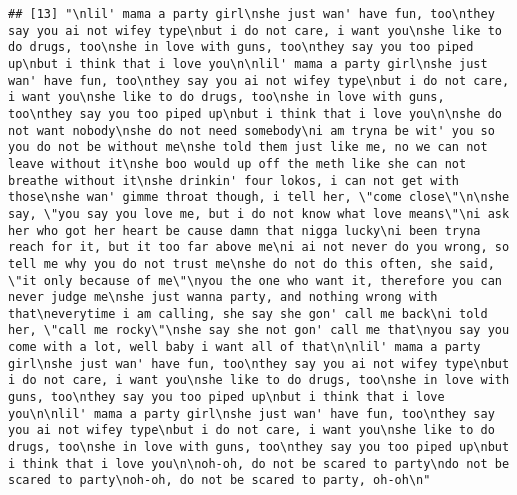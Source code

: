 \documentclass[]{article}
\begin{document}
\begin{verbatim}
## [13] "\nlil' mama a party girl\nshe just wan' have fun, too\nthey say you ai not wifey type\nbut i do not care, i want you\nshe like to do drugs, too\nshe in love with guns, too\nthey say you too piped up\nbut i think that i love you\n\nlil' mama a party girl\nshe just wan' have fun, too\nthey say you ai not wifey type\nbut i do not care, i want you\nshe like to do drugs, too\nshe in love with guns, too\nthey say you too piped up\nbut i think that i love you\n\nshe do not want nobody\nshe do not need somebody\ni am tryna be wit' you so you do not be without me\nshe told them just like me, no we can not leave without it\nshe boo would up off the meth like she can not breathe without it\nshe drinkin' four lokos, i can not get with those\nshe wan' gimme throat though, i tell her, \"come close\"\n\nshe say, \"you say you love me, but i do not know what love means\"\ni ask her who got her heart be cause damn that nigga lucky\ni been tryna reach for it, but it too far above me\ni ai not never do you wrong, so tell me why you do not trust me\nshe do not do this often, she said, \"it only because of me\"\nyou the one who want it, therefore you can never judge me\nshe just wanna party, and nothing wrong with that\neverytime i am calling, she say she gon' call me back\ni told her, \"call me rocky\"\nshe say she not gon' call me that\nyou say you come with a lot, well baby i want all of that\n\nlil' mama a party girl\nshe just wan' have fun, too\nthey say you ai not wifey type\nbut i do not care, i want you\nshe like to do drugs, too\nshe in love with guns, too\nthey say you too piped up\nbut i think that i love you\n\nlil' mama a party girl\nshe just wan' have fun, too\nthey say you ai not wifey type\nbut i do not care, i want you\nshe like to do drugs, too\nshe in love with guns, too\nthey say you too piped up\nbut i think that i love you\n\noh-oh, do not be scared to party\ndo not be scared to party\noh-oh, do not be scared to party, oh-oh\n"                                                                                                                                                                                                                                                                                                                                                                                                                                                                                                                                                                                                                                                                                                                                                                                                                                                                                                                                                                                                                                                                                                                                                                                                                                                                                                                                                                                                    
\end{verbatim}
\end{document}
